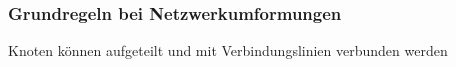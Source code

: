 										\subsubsection{Grundregeln bei Netzwerkumformungen}
					\fix \fix
										\beginip
										 	Knoten können aufgeteilt und mit Verbindungslinien verbunden werden\\
											\begin{center}
											\end{center}
										\iend

